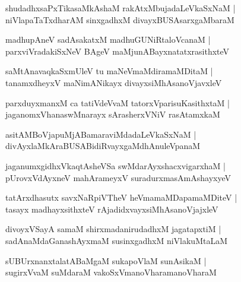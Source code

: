 \documentclass[twoside,12pt,openright]{book}
\newcounter{shloka}[chapter]
\begin{document}
\begin{shloka}%
shudadhxsaPxTikasaMkAshaM  rakAtxMbujadaLeVkaSxNaM |\\
niVlapaTaTxdharAM sinxgadhxM divayxBUSAsarxgaMbaraM 
\end{shloka}

\begin{shloka}%
madhupAneV sadAsakatxM madhuGUNiRtaloVcanaM |\\
parxviVradakiSxNeV BAgeV maMjunABayxnatatxrasithxteV 
\end{shloka}

\begin{shloka}%
saMtAnavaqkaSxmUleV tu maNeVmaMdiramaMDitaM |\\
tanamxdheyxV maNimANikayx divayxsiMhAsanoVjavxleV 
\end{shloka}

\begin{shloka}%
parxduyxmanxM ca tatiVdeVvaM tatorxVparisuKasithxtaM |\\
jaganomxVhanaswMnarayx sArasherxVNiV rasAtamxkaM 
\end{shloka}

\begin{shloka}%
asitAMBoVjapuMjABamaraviMdadaLeVkaSxNaM |\\
divAyxlaMkAraBUSABidiRvayxgaMdhAnuleVpanaM 
\end{shloka}

\begin{shloka}%
jaganumxgidhxVkaqtAsheVSa swMdarAyxshacxvigarxhaM |\\
pUrovxVdAyxneV mahArameyxV suradurxmasAmAshayxyeV 
\end{shloka}

\begin{shloka}%
tatArxdhasutx savxNaRpiVTheV heVmamaMDapamaMDiteV |\\
tasayx madhayxsithxteV rAjadidxvayxsiMhAsanoVjajxleV 
\end{shloka}

\begin{shloka}%
divoyxVSayA samaM shirxmadanirudadhxM jagatapxtiM |\\
sadAnaMdaGanashAyxmaM susinxgadhxM niVlakuMtaLaM 
\end{shloka}

\begin{shloka}%
sUBUrxnanxtalatABaMgaM sukapoVlaM sunAsikaM |\\
sugirxVvaM suMdaraM vakoSxVmanoVharamanoVharaM 
\end{shloka}
\end{document}
